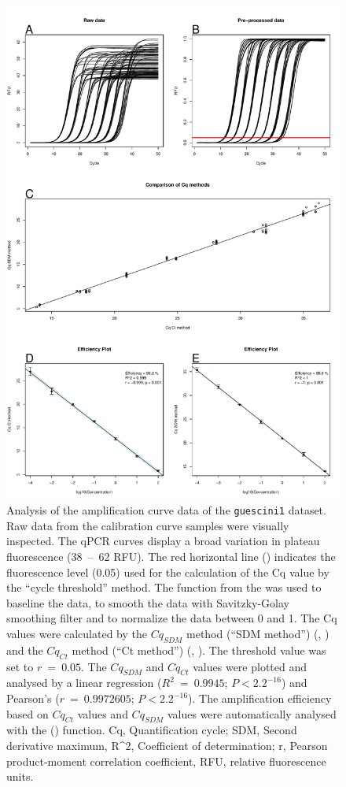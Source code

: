 \begin{figure}[htbp]
  \centering
  \includegraphics[clip=truec,trim=0.9cm 0.7cm 0.9cm 5cm, width=12cm]{figures/dilution_Cq.pdf}
  \caption{Analysis of the amplification curve data of the \texttt{guescini1} 
dataset.  Raw data from the calibration curve samples were visually 
inspected. The qPCR curves display a broad variation in plateau fluorescence 
(38~--~62 RFU). The red horizontal line (\textcolor{red}\textemdash) indicates 
the fluorescence level (0.05) used for the calculation of the Cq value by the 
``cycle threshold'' method.  The  function from the 
 was used to baseline the data, to smooth the data with 
Savitzky-Golay smoothing filter and to normalize the data between 0 and 1. 
 The Cq values were calculated by the $Cq_{SDM}$ method (``SDM 
method'') (, ) and the $Cq_{Ct}$ method (``Ct 
method'') (, ). The threshold value was set to 
$r~=~0.05$. The $Cq_{SDM}$ and $Cq_{Ct}$ values were plotted and analysed by a 
linear regression ($R^{2}~=~0.9945$; $P < 2.2^{-16}$) and Pearson's 
($r~=~0.9972605$; $P < 2.2^{-16}$). The amplification efficiency based on 
 $Cq_{Ct}$ values and  $Cq_{SDM}$ values were 
automatically analysed with the  () function. Cq, 
Quantification cycle; SDM, Second derivative maximum, R\textasciicircum2, 
Coefficient of determination; r, Pearson product-moment correlation 
coefficient, RFU, relative fluorescence units.}
  \label{figure:dilution_Cq}
\end{figure}

